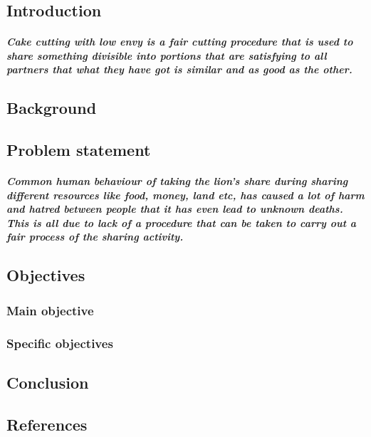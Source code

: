 \documentclass[12pt]{report}
\title{\textb{CAKE CUTTING WITH LOW ENVY}}
\author{MPUUGA FAIZO, TUZA JOHN, KAMIGISHA KEITH, NAMUTEBI JAMILLAH MAGO.}
\begin{document}
\maketitle
\chapter{}
\section{Introduction} 
\paragraph{Cake cutting with low envy is a fair cutting procedure that is used to share something divisible into portions that are satisfying to all partners that what they have got is similar and as good as the other. }


\section{Background}
\section{Problem statement}
\paragraph{Common human behaviour of taking the lion's share during sharing different resources like food, money, land etc, has caused a lot of harm and hatred between people that it has even lead to unknown deaths. This is all due to lack of a procedure that can be taken to carry out a fair process of the sharing activity. }
\section{Objectives}
\subsection{Main objective}
\paragraph{}
\subsection{Specific objectives}
\section{Conclusion}
\section{References}
\end{document}
